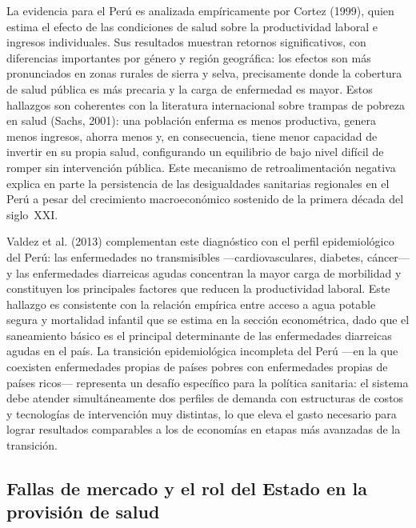 \documentclass[12pt]{article}
\begin{document}
La evidencia para el Perú es analizada empíricamente por Cortez (1999), quien estima el efecto de
las condiciones de salud sobre la productividad laboral e ingresos individuales. Sus resultados
muestran retornos significativos, con diferencias importantes por género y región geográfica: los
efectos son más pronunciados en zonas rurales de sierra y selva, precisamente donde la cobertura de
salud pública es más precaria y la carga de enfermedad es mayor. Estos hallazgos son coherentes
con la literatura internacional sobre trampas de pobreza en salud (Sachs, 2001): una población
enferma es menos productiva, genera menos ingresos, ahorra menos y, en consecuencia, tiene menor
capacidad de invertir en su propia salud, configurando un equilibrio de bajo nivel difícil de romper
sin intervención pública. Este mecanismo de retroalimentación negativa explica en parte la
persistencia de las desigualdades sanitarias regionales en el Perú a pesar del crecimiento
macroeconómico sostenido de la primera década del siglo~XXI.

Valdez et al. (2013) complementan este diagnóstico con el perfil epidemiológico del Perú: las
enfermedades no transmisibles ---cardiovasculares, diabetes, cáncer--- y las enfermedades
diarreicas agudas concentran la mayor carga de morbilidad y constituyen los principales factores
que reducen la productividad laboral. Este hallazgo es consistente con la relación empírica entre
acceso a agua potable segura y mortalidad infantil que se estima en la sección econométrica, dado
que el saneamiento básico es el principal determinante de las enfermedades diarreicas agudas en el
país. La transición epidemiológica incompleta del Perú ---en la que coexisten enfermedades propias
de países pobres con enfermedades propias de países ricos--- representa un desafío específico para
la política sanitaria: el sistema debe atender simultáneamente dos perfiles de demanda con
estructuras de costos y tecnologías de intervención muy distintas, lo que eleva el gasto necesario
para lograr resultados comparables a los de economías en etapas más avanzadas de la transición.

\subsection{Fallas de mercado y el rol del Estado en la provisión de salud}
\end{document}
